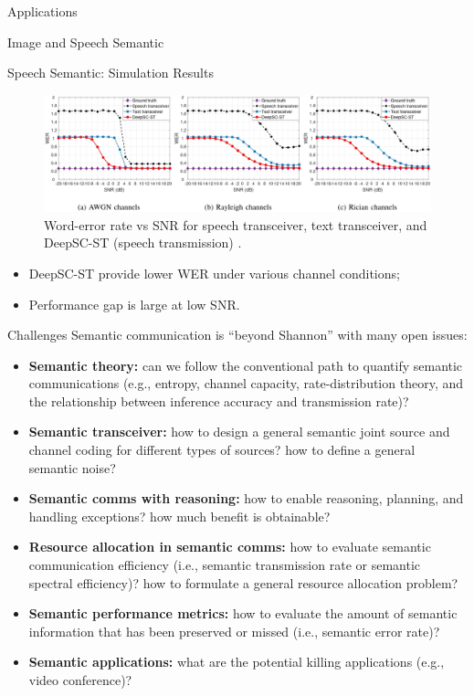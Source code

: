 \documentclass[presentation,mathserif,9pt]{beamer}
\begin{document}
\begin{section}{Applications}
\begin{subsection}{Image and Speech Semantic}
		\begin{frame}{Speech Semantic: Simulation Results}
			\begin{figure}
				\includegraphics[width=\textwidth]{assets/semantic_speech_performance.jpg}
				\caption{Word-error rate vs SNR for speech transceiver, text transceiver, and DeepSC-ST (speech transmission) \cite{Weng2022}.}
			\end{figure}
			\begin{itemize}
				\item DeepSC-ST provide lower WER under various channel conditions;
				\item Performance gap is large at low SNR.
			\end{itemize}
		\end{frame}
	\end{subsection}
\end{section}

\begin{frame}{Challenges}
	Semantic communication is ``beyond Shannon'' with many open issues:
	\begin{itemize}
		\item \textbf{Semantic theory:} can we follow the conventional path to quantify semantic communications (e.g., entropy, channel capacity, rate-distribution theory, and the relationship between inference accuracy and transmission rate)?
		\item \textbf{Semantic transceiver:} how to design a general semantic joint source and channel coding for different types of sources? how to define a general semantic noise?
		\item \textbf{Semantic comms with reasoning:} how to enable reasoning, planning, and handling exceptions? how much benefit is obtainable?
		\item \textbf{Resource allocation in semantic comms:} how to evaluate semantic communication efficiency (i.e., semantic transmission rate or semantic spectral efficiency)? how to formulate a general resource allocation problem?
		\item \textbf{Semantic performance metrics:} how to evaluate the amount of semantic information that has been preserved or missed (i.e., semantic error rate)?
		\item \textbf{Semantic applications:} what are the potential killing applications (e.g., video conference)?
	\end{itemize}
\end{frame}
\end{document}
